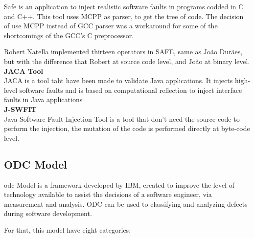 Safe is an application to inject realistic software faults in programs codded in C and C++.
This tool uses MCPP as parser, to get the tree of code. The decision of use MCPP instead of GCC parser was a workaround for some of the shortcomings of the GCC's C preprocessor.

Robert Natella implemented thirteen operators in SAFE, same as João Durães\cite{duraes2006emulation}, but with the difference that Robert  at source code level, and João at binary level.\\


\textbf{JACA Tool}\\

JACA\cite{regina2003jaca} is a tool taht have been made to validate Java applications. It injects high-level software faults and is based on computational reflection to inject interface faults in Java applications
\cite{martins2002jaca} \\

\textbf{J-SWFIT} \\

Java Software Fault Injection Tool\cite{sanches2011j} is a tool that don't need the source code to perform the injection, the mutation of the code is performed directly at byte-code level.


\subsection{ODC Model}
\ac{odc}\cite{bridge1998orthogonal} Model is a framework developed by IBM\cite{chillarege2004orthogonal}, created to improve the level of technology available to assist the decisions of a software engineer, via measurement and analysis.
ODC can be used to classifying and analyzing defects during software development.

For that, this model have eight categories:

